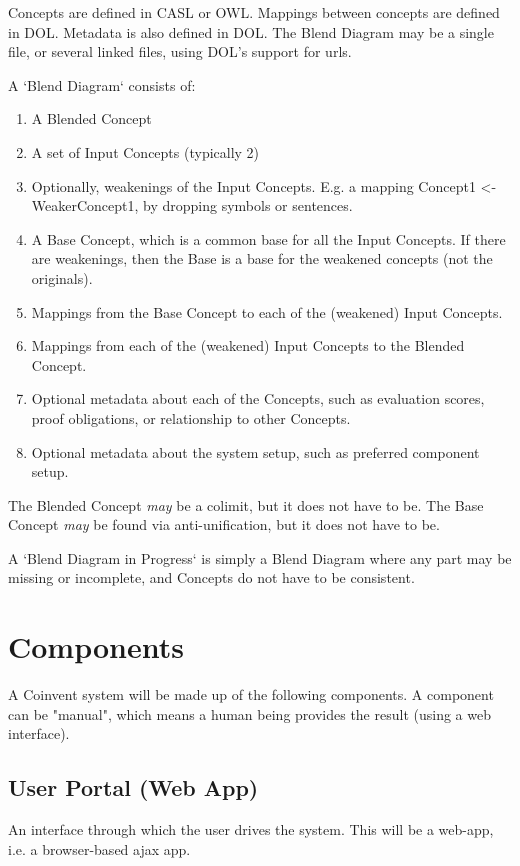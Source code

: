 \documentclass[10pt]{article}
\begin{document}
Concepts are defined in CASL or OWL. Mappings between concepts are defined in DOL. Metadata is also defined in DOL. The Blend Diagram may be a single file, or several linked files, using DOL's support for urls.

A `Blend Diagram` consists of:
\begin{enumerate}
\item A Blended Concept
\item A set of Input Concepts (typically 2)
\item Optionally, weakenings of the Input Concepts. E.g. a mapping Concept1 <- WeakerConcept1, by dropping symbols or sentences.
\item A Base Concept, which is a common base for all the Input Concepts. If there are weakenings, then the Base is a base for the weakened concepts (not the originals).
\item Mappings from the Base Concept to each of the (weakened) Input Concepts.
\item Mappings from each of the (weakened) Input Concepts to the Blended Concept.
\item Optional metadata about each of the Concepts, such as evaluation scores,  proof obligations, or relationship to other Concepts.
\item Optional metadata about the system setup, such as preferred component setup.
\end{enumerate}
The Blended Concept {\em may} be a colimit, but it does not have to be.
The Base Concept {\em may} be found via anti-unification, but it does not have to be.

A `Blend Diagram in Progress` is simply a Blend Diagram where any part may be missing or incomplete, and Concepts do not have to be consistent. 


\section{Components}\label{sec:components}

A Coinvent system will be made up of the following components.
A component can be "manual", which means a human being provides the result (using a web interface).

\subsection{User Portal (Web App)}\label{sec:userportal}
An interface through which the user drives the system. This will be a web-app,
i.e. a browser-based ajax app.
\end{document}
